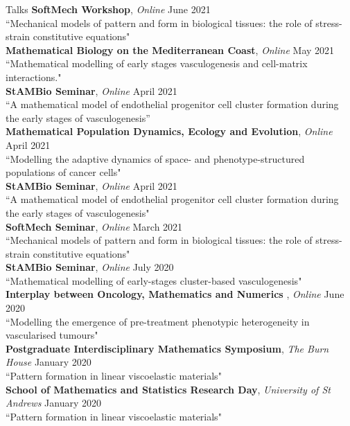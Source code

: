 \documentclass{resume} %
\begin{document}
\begin{rSection}{Talks}
{\bf SoftMech Workshop}, {\em Online} \hfill {June 2021} \\
{``Mechanical models of pattern and form in biological tissues: the role of stress-strain constitutive equations"}  \\
{\bf Mathematical Biology on the Mediterranean Coast}, {\em Online} \hfill {May 2021} \\
{``Mathematical modelling of early stages vasculogenesis and cell-matrix interactions."}  \\
{\bf StAMBio Seminar}, {\em Online} \hfill {April 2021} \\
{``A mathematical model of endothelial progenitor cell cluster formation during the early stages of vasculogenesis''} \\
{\bf Mathematical Population Dynamics, Ecology and Evolution}, {\em Online} \hfill {April 2021} \\
{``Modelling the adaptive dynamics of space- and phenotype-structured populations of cancer cells"}  \\
{\bf StAMBio Seminar}, {\em Online} \hfill {April 2021} \\
{``A mathematical model of endothelial progenitor cell cluster formation during the early stages of vasculogenesis"}  \\
{\bf SoftMech Seminar}, {\em Online} \hfill {March 2021} \\
{``Mechanical models of pattern and form in biological tissues: the role of stress-strain constitutive equations"}  \\
{\bf StAMBio Seminar}, {\em Online} \hfill {July 2020} \\
{``Mathematical modelling of early-stages cluster-based vasculogenesis"}  \\
{\bf Interplay between Oncology, Mathematics and Numerics }, {\em Online} \hfill {June 2020} \\
{``Modelling the emergence of pre-treatment phenotypic heterogeneity in vascularised tumours"}  \\
{\bf Postgraduate Interdisciplinary Mathematics Symposium}, {\em The Burn House} \hfill {January 2020} \\
{``Pattern formation in linear viscoelastic materials"}  \\
{\bf School of Mathematics and Statistics Research Day}, {\em University of St Andrews} \hfill {January 2020} \\
{``Pattern formation in linear viscoelastic materials"}  \\

\end{rSection}
\end{document}
